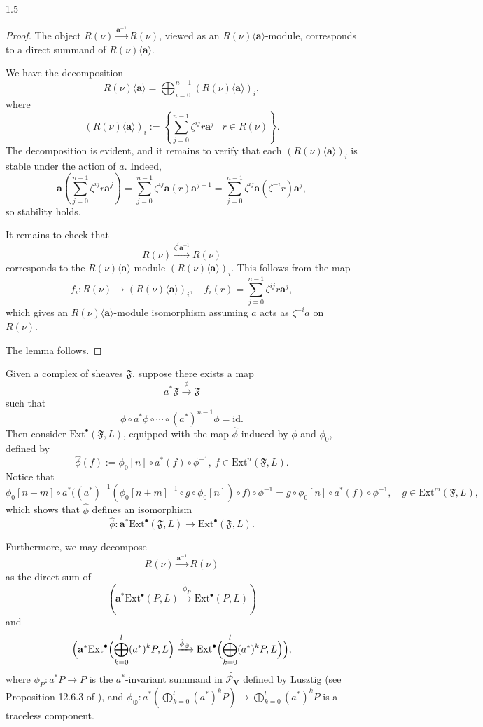 \documentclass[10pt]{amsart}
\begin{document}
\begin{spacing}{1.5}
\begin{proof}
The object $R(\nu) \xrightarrow{\mathbf{a}^{-1}} R(\nu)$, viewed as an $R(\nu)\langle\mathbf{a}\rangle$-module, corresponds to a direct summand of $R(\nu)\langle\mathbf{a}\rangle$.

We have the decomposition
\[
R(\nu)\langle\mathbf{a}\rangle = \bigoplus_{i=0}^{n-1} (R(\nu)\langle\mathbf{a}\rangle)_i,
\]
where
\[
(R(\nu)\langle\mathbf{a}\rangle)_i := \left\{ \sum_{j=0}^{n-1} \zeta^{ij} r \mathbf{a}^j \mid r \in R(\nu) \right\}.
\]
The decomposition is evident, and it remains to verify that each $(R(\nu)\langle\mathbf{a}\rangle)_i$ is stable under the action of $a$. Indeed,
\[
\mathbf{a} \left( \sum_{j=0}^{n-1} \zeta^{ij} r \mathbf{a}^j \right)
= \sum_{j=0}^{n-1} \zeta^{ij} \mathbf{a}(r) \mathbf{a}^{j+1}
= \sum_{j=0}^{n-1} \zeta^{ij} \mathbf{a}(\zeta^{-i} r) \mathbf{a}^j,
\]
so stability holds.

It remains to check that
\[
R(\nu) \xrightarrow{\zeta^{i} \mathbf{a}^{-1}} R(\nu)
\]
corresponds to the $R(\nu)\langle\mathbf{a}\rangle$-module $(R(\nu)\langle\mathbf{a}\rangle)_i$. This follows from the map
\[
f_i : R(\nu) \to (R(\nu)\langle\mathbf{a}\rangle)_i, \quad f_i(r) = \sum_{j=0}^{n-1} \zeta^{ij} r \mathbf{a}^j,
\]
which gives an $R(\nu)\langle\mathbf{a}\rangle$-module isomorphism assuming $a$ acts as $\zeta^{-i}a$ on $R(\nu).$

The lemma follows.
\end{proof}
Given a complex of sheaves $\mathfrak{F}$, suppose there exists a map
\[
a^* \mathfrak{F} \xrightarrow{\phi} \mathfrak{F}
\]
such that
\[
\phi \circ a^* \phi \circ \cdots \circ (a^*)^{n-1} \phi = \mathrm{id}.
\]
Then consider $\mathrm{Ext}^{\bullet}(\mathfrak{F}, L)$, equipped with the map $\hat{\phi}$ induced by $\phi$ and $\phi_0$, defined by
\[
\hat{\phi}(f) := \phi_0[n] \circ a^*(f) \circ \phi^{-1},\ f\in \mathrm{Ext}^{n}(\mathfrak{F}, L).
\]
Notice that
\[
\phi_0[n+m] \circ a^*\bigl( (a^*)^{-1}(\phi_0[n+m]^{-1} \circ g \circ \phi_0[n]) \circ f \bigr) \circ \phi^{-1}
= g \circ \phi_0[n] \circ a^*(f) \circ \phi^{-1},\quad g\in \mathrm{Ext}^{m}(\mathfrak{F}, L),
\]
which shows that $\hat{\phi}$ defines an isomorphism
\[
\hat{\phi} : \mathbf{a}^* \mathrm{Ext}^{\bullet}(\mathfrak{F}, L) \to \mathrm{Ext}^{\bullet}(\mathfrak{F}, L).
\]

Furthermore, we may decompose
\[
R(\nu) \xrightarrow{\mathbf{a}^{-1}} R(\nu)
\]
as the direct sum of
\[
(\mathbf{a}^* \mathrm{Ext}^{\bullet}(P, L) \xrightarrow{\hat{\phi}_P} \mathrm{Ext}^{\bullet}(P, L))
\]
and
\[
\Bigl( \mathbf{a}^* \mathrm{Ext}^{\bullet}\Bigl( \bigoplus_{k=0}^{l} (a^*)^k P, L \Bigr) 
\xrightarrow{\hat{\phi}_{\oplus}} 
\mathrm{Ext}^{\bullet}\Bigl( \bigoplus_{k=0}^{l} (a^*)^k P, L \Bigr) \Bigr),
\]
where $\phi_P : a^* P \to P$ is the $a^*$-invariant summand in $\widetilde{\mathcal{P}_{\mathbf{V}}}$ defined by Lusztig (see Proposition 12.6.3 of \cite{lusztig2010introduction}), and $\phi_{\oplus} : a^*(\bigoplus_{k=0}^{l} (a^*)^k P) \to \bigoplus_{k=0}^{l} (a^*)^k P$ is a traceless component.


\end{spacing}
\end{document}
